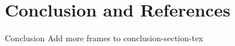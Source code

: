 \section{Conclusion and References}
    
    \frame{\sectionpage}
    
    \begin{frame}{Conclusion}
         \centering
         \huge{Add more frames to conclusion-section-tex}
    \end{frame}